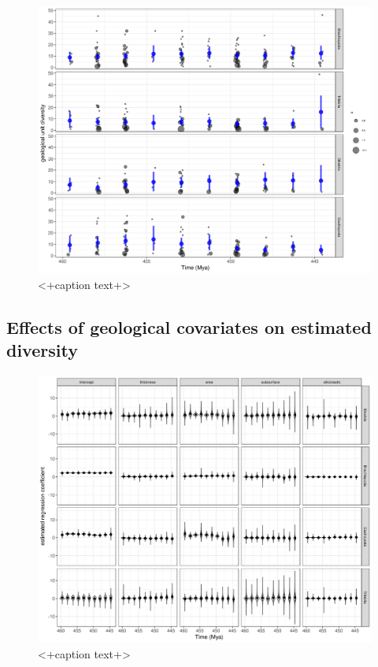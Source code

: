 \documentclass[12pt,letterpaper]{article}
\begin{document}
\begin{figure}[ht]
  \centering
  \includegraphics[width=\textwidth,height=0.5\textheight,keepaspectratio=true]{figure/unitdiv_time}
  \caption{<+caption text+>}
  \label{fig:<+label+>}
\end{figure}





\subsection{Effects of geological covariates on estimated diversity}

\begin{figure}[ht]
  \centering
  \includegraphics[width=\textwidth,height=0.5\textheight,keepaspectratio=true]{figure/cov_time}
  \caption{<+caption text+>}
  \label{fig:<+label+>}
\end{figure}
\end{document}
